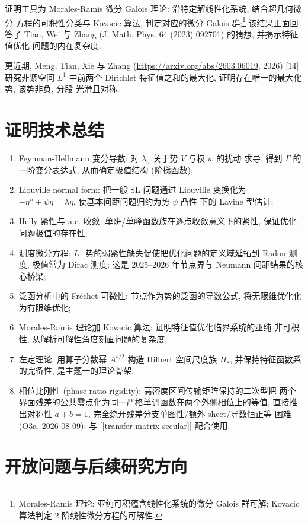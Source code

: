 \documentclass[UTF8]{ctexart}
\begin{document}
证明工具为 Morales-Ramis 微分 Galois 理论: 沿特定解线性化系统, 结合超几何微分
方程的可积性分类与 Kovacic 算法, 判定对应的微分 Galois 群;\footnote{Morales-Ramis 理论: 亚纯可积蕴含线性化系统的微分 Galois 群可解; Kovacic 算法判定 2 阶线性微分方程的可解性.} 该结果正面回答了
Tian, Wei 与 Zhang (J. Math. Phys. 64 (2023) 092701) 的猜想, 并揭示特征值优化
问题的内在复杂度.

更近期, Meng, Tian, Xie 与 Zhang (\url{https://arxiv.org/abs/2603.06019}, 2026) [14] 研究非紧空间 $L^1$
中前两个 Dirichlet 特征值之和的最大化, 证明存在唯一的最大化势, 该势非负, 分段
光滑且对称.

\section{证明技术总结}

\begin{enumerate}
	\item Feynman-Hellmann 变分导数: 对 $\lambda_n$ 关于势 $V$ 与权 $w$ 的扰动
		求导, 得到 $\Gamma$ 的一阶变分表达式, 从而确定极值结构 (阶梯函数);
	\item Liouville normal form: 把一般 SL 问题通过 Liouville 变换化为
		$-\eta'' + \psi \eta = \lambda \eta$, 使基本间距问题归约为势 $\psi$ 凸性
		下的 Lavine 型估计;
	\item Helly 紧性与 a.e. 收敛: 单阱/单峰函数族在逐点收敛意义下的紧性,
		保证优化问题极值的存在性;
	\item 测度微分方程: $L^1$ 势的弱紧性缺失促使把优化问题的定义域延拓到
		Radon 测度, 极值常为 Dirac 测度; 这是 2025--2026 年节点界与 Neumann
		间距结果的核心桥梁;
	\item 泛函分析中的 Fr\'echet 可微性: 节点作为势的泛函的导数公式,
		将无限维优化化为有限维优化;
	\item Morales-Ramis 理论加 Kovacic 算法: 证明特征值优化临界系统的亚纯
		非可积性, 从解析可解性角度刻画问题的复杂度;
	\item 左定理论: 用算子分数幂 $A^{s/2}$ 构造 Hilbert 空间尺度族 $H_s$,
		并保持特征函数系的完备性, 是主题一的理论骨架.
	\item 相位比刚性 (phase-ratio rigidity): 高密度区间传输矩阵保持的二次型把
		两个界面残差的公共零点化为同一严格单调函数在两个外侧相位上的等值,
		直接推出对称性 $a+b=1$, 完全绕开残差分支单图性/额外 sheet/导数恒正等
		困难 (O3a, 2026-08-09); 与 [[transfer-matrix-secular]] 配合使用.
\end{enumerate}

\section{开放问题与后续研究方向}
\end{document}

